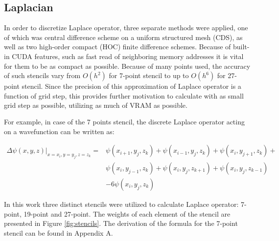 \subsection{Laplacian}
In order to discretize Laplace operator, three separate methods were applied, one of which was central difference scheme  on a uniform structured mesh (CDS), as well as two high-order compact (HOC) finite difference schemes.\cite{spotz1996hoc}
Because of built-in CUDA features, such as fast read of neighboring memory addresses
it is vital for them to be as compact as possible. Because of many points used, the accuracy of such stencils vary from $O(h^2)$ for 7-point stencil to up to $O(h^6)$ for 27-point stencil. Since the precision of this approximation of Laplace operator is a function of grid step, this provides further motivation to calculate with as small grid step as possible, utilizing as much of VRAM as possible.

For example, in case of the 7 points stencil, the discrete Laplace operator acting on a wavefunction can be written as:

\begin{equation}
	\begin{aligned}
		\Delta \psi(x,y,z) \lvert_{x=x_i,y=y_j,z=z_k} =
		& \psi(x_{i+1},y_j,z_k) + \psi(x_{i-1},y_j,z_k) + \psi(x_i,y_{j+1},z_k) + \\
		& \psi(x_i,y_{j-1},z_k) + \psi(x_i,y_j,z_{k+1}) + \psi(x_i,y_j,z_{k-1}) \\
		& -6\psi(x_i,y_j,z_k)
	\end{aligned}
\end{equation}

In this work three distinct stencils were utilized to calculate Laplace operator: 7-point, 19-point and 27-point. The weights of each element of the stencil are presented in Figure \ref{fig:stencils}.
The derivation of the formula for the 7-point stencil can be found in Appendix A.

